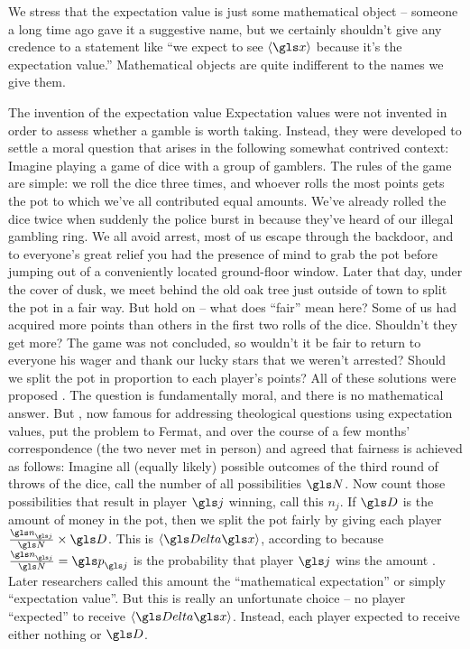 We stress that the expectation value is just some mathematical
object -- someone a long time ago gave it a suggestive 
name, but we certainly shouldn't 
give any credence to a statement like ``we expect to see $\ave{\x}$ 
because it's the expectation value.'' Mathematical objects
are quite indifferent to the names we give them.


\begin{history}{The invention of the expectation value}
Expectation values 
were not invented in order to assess whether a gamble is 
worth taking. Instead, they were developed to settle a  
moral question that arises in the following somewhat contrived 
context: Imagine playing a game of dice with a 
group of gamblers. The rules of the game are simple: we 
roll the dice three times,  and whoever rolls the most points 
gets the pot to which we've all contributed equal amounts. 
We've already rolled the dice twice when suddenly the 
police burst in because they've heard of our illegal gambling ring. 
We all avoid arrest, most of us escape through the backdoor, 
and to everyone's great relief you had the presence of mind 
to grab the pot before jumping out of a conveniently located 
ground-floor window. Later that day, under the cover of dusk, 
we meet behind the old oak tree just outside of town to split 
the pot in a fair way. But hold on -- what does ``fair'' mean here?
Some of us had acquired more points than others in the first 
two rolls of the dice. Shouldn't they get more? The game was 
not concluded, so wouldn't it be fair to return to everyone his 
wager and thank our lucky stars that we weren't arrested? 
Should we split the pot in proportion to each player's points? 
All of these solutions were proposed \cite{Devlin2008}.
The question is fundamentally moral, and there is no 
mathematical answer. But , now famous for 
addressing theological questions using expectation values, put the 
problem to Fermat, and over the course of a few months' 
correspondence (the two never met in person)  and 
 agreed that fairness is achieved as follows: 
Imagine all (equally likely) possible outcomes of the third round 
of throws of the dice, call the number of all possibilities $\N$. 
Now count those possibilities that result in player $\gj$ winning, 
call this $n_j$. If $\gD$ is the amount of money in the pot, then 
we split the pot fairly by giving each player
 $\frac{\gn_\gj}{\N}\times \gD$.
This is $\ave{\D \x}$, according to  
because $\frac{\gn_\gj}{\N}=\p_\gj$ is the probability that player $\gj$ wins the
amount \gD. 
Later researchers called this amount the ``mathematical expectation''  
or simply ``expectation value''. But this is really an unfortunate choice 
 -- no player ``expected'' to receive $\ave{\D\x}$. 
Instead, each player expected to receive either nothing or $\gD$. 
\end{history}

